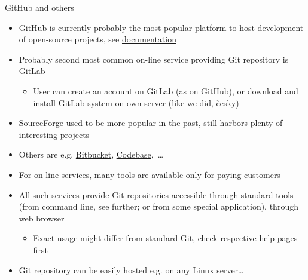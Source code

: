 \documentclass[compress, xelatex, 11pt, xcolor=svgnames, aspectratio=169,
	hyperref={
		bookmarks=true,
		unicode=true,
		colorlinks=true,
		pdftitle={Linux, command line and MetaCentrum},
		plainpages=false,
		pdfauthor={Vojtech Zeisek},
		pdfsubject={Course about use of Linux command line, writing shell scripts and using MetaCentrum of CESNET},
		pdfcreator={XeLaTeX},
		pdfkeywords={Linux, GNU, BASH, shell, command line, MetaCentrum},
		linkcolor=DarkRed, %
		anchorcolor=DarkBlue, %
		citecolor=Indigo, %
		filecolor=NavyBlue, %
		menucolor=DarkMagenta, %
		urlcolor=DarkBlue, %
		},
	url={hyphens, lowtilde} %
	]{beamer}
\begin{document}
\begin{frame}{GitHub and others}
	\begin{itemize}
		\item \href{https://github.com/}{GitHub} is currently probably the most popular platform to host development of open-source projects, see \href{https://support.github.com/}{documentation}
		\item Probably second most common on-line service providing Git repository is \href{https://about.gitlab.com/}{GitLab}
		\begin{itemize}
			\item User can create an account on GitLab (as on GitHub), or download and install GitLab system on own server (like \href{https://sorbus.ibot.cas.cz/en/gitlab}{we did}, \href{https://sorbus.ibot.cas.cz/cs/gitlab}{česky})
		\end{itemize}
		\item \href{https://sourceforge.net/}{SourceForge} used to be more popular in the past, still harbors plenty of interesting projects
		\item Others are e.g. \href{https://bitbucket.org/}{Bitbucket}, \href{https://www.codebasehq.com/}{Codebase},~\ldots
		\item For on-line services, many tools are available only for paying customers
		\item All such services provide Git repositories accessible through standard tools (from command line, see further; or from some special application), through web browser
		\begin{itemize}
			\item Exact usage might differ from standard Git, check respective help pages first
		\end{itemize}
		\item Git repository can be easily hosted e.g. on any Linux server\ldots
	\end{itemize}
\end{frame}
\end{document}
